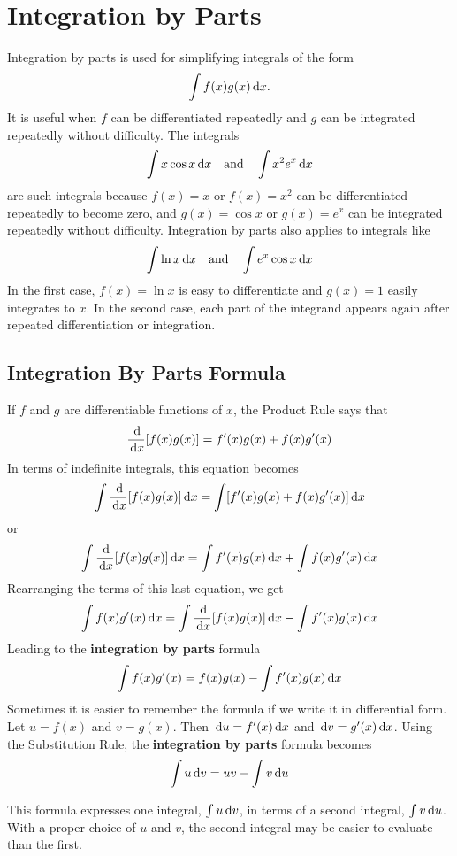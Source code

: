 \section{Integration by Parts}
Integration by parts is used for simplifying integrals of the form
\[ \int f(x)g(x) \,\mathrm{d} x \text{.} \]
It is useful when \(f\) can be differentiated repeatedly and $g$ can be integrated repeatedly without difficulty. The integrals
\[ \int x \cos x \,\mathrm{d} x \quad \text{and} \quad \int x^2 e^x \,\mathrm{d} x \]
are such integrals because $f(x)=x$ or $f(x)=x^2$ can be differentiated repeatedly to become zero, and $g(x)=\cos x$ or $g(x)=e^x$ can be integrated repeatedly without difficulty. Integration by parts also applies to integrals like
\[ \int \ln x \,\mathrm{d} x \quad \text{and} \quad \int e^x \cos x \,\mathrm{d} x \]
In the first case, $f(x)=\ln x$ is easy to differentiate and $g(x)=1$ easily integrates to $x$. In the second case, each part of the integrand appears again after repeated differentiation or integration.


\subsection{Integration By Parts Formula}

If $f$ and $g$ are differentiable functions of $x$, the Product Rule says that
$$ \frac{\,\mathrm{d}}{\,\mathrm{d} x} [f(x)g(x)]=f'(x)g(x)+f(x)g'(x) $$
In terms of indefinite integrals, this equation becomes
$$ \int \frac{\,\mathrm{d}}{\,\mathrm{d} x} [f(x)g(x)] \,\mathrm{d} x=\int [f'(x)g(x)+f(x)g'(x)] \,\mathrm{d} x $$
or
$$ \int \frac{\,\mathrm{d}}{\,\mathrm{d} x} [f(x)g(x)] \,\mathrm{d} x=
\int f'(x)g(x) \,\mathrm{d} x + \int f(x)g'(x) \,\mathrm{d} x $$
Rearranging the terms of this last equation, we get
$$ \int f(x)g'(x) \,\mathrm{d} x =
\int \frac{\,\mathrm{d}}{\,\mathrm{d} x}[f(x)g(x)]\,\mathrm{d} x - \int f'(x)g(x) \,\mathrm{d} x $$
Leading to the \textbf{integration by parts} formula
\begin{equation}
  \int f(x)g'(x)=f(x)g(x)-\int f'(x)g(x) \,\mathrm{d} x
\end{equation}
Sometimes it is easier to remember the formula if we write it in differential form. Let $u=f(x)$ and $v=g(x)$. Then $\,\mathrm{d} u=f'(x)\,\mathrm{d} x$ and $\,\mathrm{d} v=g'(x)\,\mathrm{d} x$. Using the Substitution Rule, the \textbf{integration by parts} formula becomes
\begin{equation}
  \int u \,\mathrm{d} v =  uv - \int v \,\mathrm{d} u
  \label{equation:intbyparts}
\end{equation}

This formula expresses one integral, $\int u \,\mathrm{d} v$, in terms of a second integral, $\int v \,\mathrm{d} u$. With a proper choice of $u$ and $v$, the second integral may be easier to evaluate than the first.

